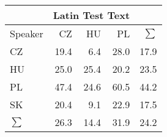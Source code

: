 \begin{tabular}{l|rrr|r}
\hline
 & \multicolumn{3}{c}{Latin Test Text} & \\
\hline
 Speaker   &   CZ &   HU &   PL &   $\sum$ \\
\hline
 CZ        & 19.4 &  6.4 & 28.0 &     17.9 \\
 HU        & 25.0 & 25.4 & 20.2 &     23.5 \\
 PL        & 47.4 & 24.6 & 60.5 &     44.2 \\
 SK        & 20.4 &  9.1 & 22.9 &     17.5 \\
\hline
 $\sum$   & 26.3 & 14.4 & 31.9 &     24.2 \\
\hline
\end{tabular}